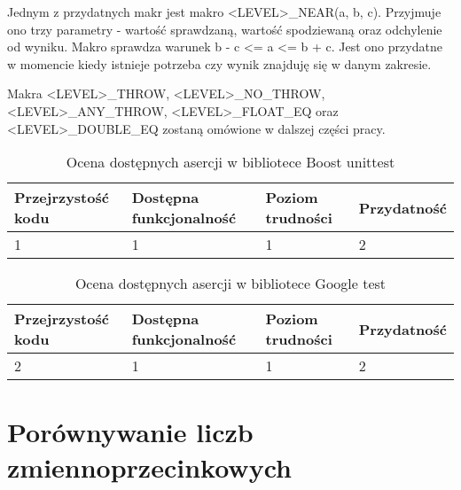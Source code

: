 \documentclass[12pt,a4paper,notitlepage]{report}
\begin{document}
Jednym z przydatnych makr jest makro <LEVEL>{\_}NEAR(a, b, c). Przyjmuje ono trzy parametry - wartość sprawdzaną, wartość spodziewaną oraz odchylenie od wyniku. Makro sprawdza warunek b - c <= a <= b + c. Jest ono przydatne w momencie kiedy istnieje potrzeba czy wynik znajduję się w danym zakresie.

Makra <LEVEL>{\_}THROW, <LEVEL>{\_}NO{\_}THROW, <LEVEL>{\_}ANY{\_}THROW, <LEVEL>{\_}FLOAT{\_}EQ oraz <LEVEL>{\_}DOUBLE{\_}EQ zostaną omówione w dalszej części pracy.

			

\begin{center}
			\begin{table}[!ht]
			\caption{Ocena dostępnych asercji w bibliotece Boost unittest}
			\label{}
			\begin{tabular}[!hc]{|l|l|l|l|}
		\hline
		Przejrzystość kodu 	&	Dostępna funkcjonalność	&	Poziom trudności	&	Przydatność \\ \hline
		1					&	1						&	1					& 	2  			\\ \hline
			\end{tabular}
			\end{table} 
		\end{center}

\begin{center}
			\begin{table}[!ht]
			\caption{Ocena dostępnych asercji w bibliotece Google test}
			\label{}
			\begin{tabular}[!hc]{|l|l|l|l|}
		\hline
		Przejrzystość kodu 	&	Dostępna funkcjonalność	&	Poziom trudności	&	Przydatność \\ \hline
		2					&	1						&	1					& 	2  			\\ \hline
			\end{tabular}
			\end{table} 
		\end{center}

\chapter{Porównywanie liczb zmiennoprzecinkowych}
\end{document}
